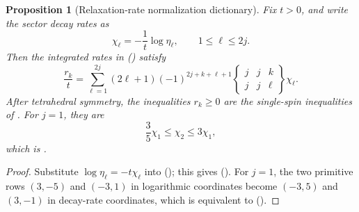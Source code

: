 \documentclass[twoside,10pt]{article}
\numberwithin{equation}{section}
\theoremstyle{slbody}
\newtheorem{proposition}[theorem]{Proposition}
\theoremstyle{definition}
\theoremstyle{remark}
\renewcommand{\eqref}[1]{%
  \textup{{\normalfont(\oldstylenums{\ref{#1}}}\normalfont)}}
\begin{document}
\begin{proposition}[Relaxation-rate normalization dictionary]
\label{prop:rate-dictionary}
Fix \(t>0\), and write the sector decay rates as
\begin{equation}\label{eq:decay-rate-definition}
 \chi_\ell=-\frac1t\log\eta_\ell,
 \qquad 1\leq\ell\leq2j.
\end{equation}
Then the integrated rates in \eqref{eq:general-integrated-rates}
satisfy
\begin{equation}\label{eq:historical-rate-dictionary}
 \frac{r_k}{t}
 =\sum_{\ell=1}^{2j}(2\ell+1)(-1)^{2j+k+\ell+1}
 \begin{Bmatrix}j&j&k\\j&j&\ell\end{Bmatrix}\chi_\ell.
\end{equation}
After tetrahedral symmetry, the inequalities \(r_k\geq0\) are the
single-spin inequalities of
\cite[Eq.~(2.20)]{GoriniVerriSudarshan1980}.  For \(j=1\), they are
\begin{equation}\label{eq:historical-spin-one-rates}
 \frac35\chi_1\leq\chi_2\leq3\chi_1,
\end{equation}
which is \cite[Eq.~(2.21)]{GoriniVerriSudarshan1980}.
\end{proposition}

\begin{proof}
Substitute \(\log\eta_\ell=-t\chi_\ell\) into
\eqref{eq:general-integrated-rates}; this gives
\eqref{eq:historical-rate-dictionary}.  For \(j=1\), the two
primitive rows \((3,-5)\) and \((-3,1)\) in logarithmic coordinates
become \((-3,5)\) and \((3,-1)\) in decay-rate coordinates, which is
equivalent to \eqref{eq:historical-spin-one-rates}.
\end{proof}
\end{document}
